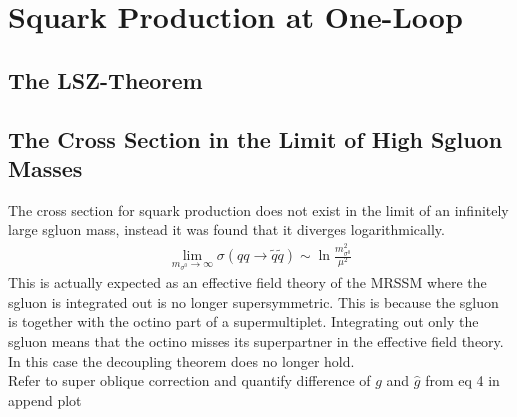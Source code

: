 \section{Squark Production at One-Loop}


\subsection{The LSZ-Theorem}


\subsection{The Cross Section in the Limit of High Sgluon Masses}
The cross section for squark production does not exist in the limit of an infinitely large sgluon mass, instead it was found that it diverges logarithmically.\\
\begin{align}
\lim_{m_{\sigma^0}\to\infty} \sigma(qq \to \tilde{q}\tilde{q}) \sim \ln \frac{m_{\sigma^0}^2}{\mu^2}
\end{align}
This is actually expected as an effective field theory of the MRSSM where the sgluon is integrated out is no longer supersymmetric. This is because the sgluon is together with the octino part of a supermultiplet. Integrating out only the sgluon means that the octino misses its superpartner in the effective field theory. In this case the decoupling theorem \cite{Appelquist:1974tg} does no longer hold.\\
Refer to super oblique correction and quantify difference of $g$ and $\hat{g}$ from eq 4 in \cite{Cheng:1997sq}\\
append plot